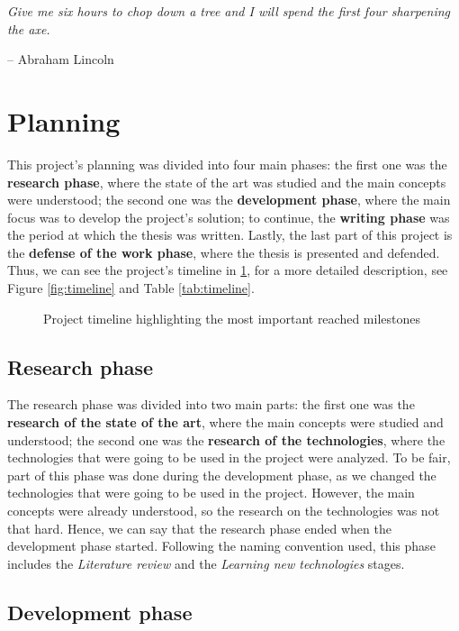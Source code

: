 \epigraph{\textit{Give me six hours to chop down a tree and I will spend the first four sharpening the axe.}}{-- \textup{Abraham Lincoln}}

\section{Planning}

This project's planning was divided into four main phases: the first one was the \textbf{research phase}, where the state of the art was studied and the main concepts were understood; the second one was the \textbf{development phase}, where the main focus was to develop the project's solution; to continue, the \textbf{writing phase} was the period at which the thesis was written. Lastly, the last part of this project is the \textbf{defense of the work phase}, where the thesis is presented and defended. Thus, we can see the project's timeline in \ref{fig:summary_timeline}, for a more detailed description, see Figure \ref{fig:timeline} and Table \ref{tab:timeline}.

\begin{figure}[ht]
    \centering
    
    \caption{Project timeline highlighting the most important reached milestones}
    \label{fig:summary_timeline}
\end{figure}

\subsection{Research phase}

The research phase was divided into two main parts: the first one was the \textbf{research of the state of the art}, where the main concepts were studied and understood; the second one was the \textbf{research of the technologies}, where the technologies that were going to be used in the project were analyzed. To be fair, part of this phase was done during the development phase, as we changed the technologies that were going to be used in the project. However, the main concepts were already understood, so the research on the technologies was not that hard. Hence, we can say that the research phase ended when the development phase started. Following the naming convention used, this phase includes the \textit{Literature review} and the \textit{Learning new technologies} stages.

\subsection{Development phase}

